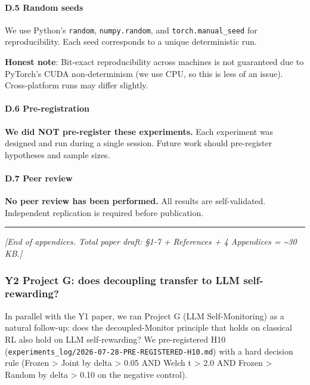 \documentclass[
]{article}
\begin{document}
\paragraph{D.5 Random seeds}\label{d.5-random-seeds}

We use Python's \texttt{random}, \texttt{numpy.random}, and
\texttt{torch.manual\_seed} for reproducibility. Each seed corresponds
to a unique deterministic run.

\textbf{Honest note}: Bit-exact reproducibility across machines is not
guaranteed due to PyTorch's CUDA non-determinism (we use CPU, so this is
less of an issue). Cross-platform runs may differ slightly.

\paragraph{D.6 Pre-registration}\label{d.6-pre-registration}

\textbf{We did NOT pre-register these experiments.} Each experiment was
designed and run during a single session. Future work should
pre-register hypotheses and sample sizes.

\paragraph{D.7 Peer review}\label{d.7-peer-review}

\textbf{No peer review has been performed.} All results are
self-validated. Independent replication is required before publication.

\begin{center}\rule{0.5\linewidth}{0.5pt}\end{center}

\emph{{[}End of appendices. Total paper draft: §1-7 + References + 4
Appendices = \textasciitilde30 KB.{]}}

\subsubsection{Y2 Project G: does decoupling transfer to LLM
self-rewarding?}\label{y2-project-g-does-decoupling-transfer-to-llm-self-rewarding}

In parallel with the Y1 paper, we ran Project G (LLM Self-Monitoring) as
a natural follow-up: does the decoupled-Monitor principle that holds on
classical RL also hold on LLM self-rewarding? We pre-registered H10
(\texttt{experiments\_log/2026-07-28-PRE-REGISTERED-H10.md}) with a hard
decision rule (Frozen \textgreater{} Joint by delta \textgreater{} 0.05
AND Welch t \textgreater{} 2.0 AND Frozen \textgreater{} Random by delta
\textgreater{} 0.10 on the negative control).
\end{document}
